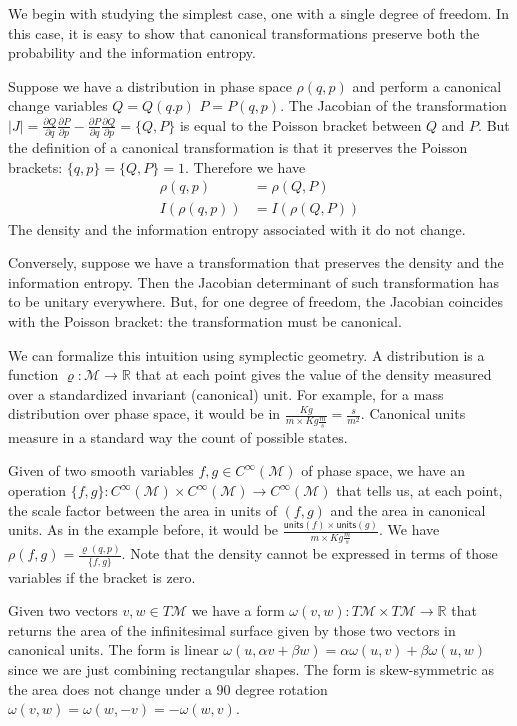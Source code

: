 \documentclass[smallextended]{svjour3}
\numberwithin{equation}{section}
\theoremstyle{definition}
\begin{document}
We begin with studying the simplest case, one with a single degree of freedom. In this case, it is easy to show that canonical transformations preserve both the probability and the information entropy.

Suppose we have a distribution in phase space $\rho(q, p)$ and perform a canonical change variables $Q=Q(q.p)$ $P=P(q,p)$. The Jacobian of the transformation $|J| = \frac{\partial Q}{\partial q}\frac{\partial P}{\partial p} - \frac{\partial P}{\partial q} \frac{\partial Q}{\partial p} = \{Q, P\}$ is equal to the Poisson bracket between $Q$ and $P$. But the definition of a canonical transformation is that it preserves the Poisson brackets: $\{q,p\} = \{Q, P\} = 1$. Therefore we have
\begin{align}
\rho(q, p) &= \rho(Q,P) \\
I(\rho(q,p)) &= I(\rho(Q,P))
\end{align}
The density and the information entropy associated with it do not change.

Conversely, suppose we have a transformation that preserves the density and the information entropy. Then the Jacobian determinant of such transformation has to be unitary everywhere. But, for one degree of freedom, the Jacobian coincides with the Poisson bracket: the transformation must be canonical.

We can formalize this intuition using symplectic geometry. A distribution is a function $\varrho : \mathcal{M} \rightarrow \mathbb{R}$ that at each point gives the value of the density measured over a standardized invariant (canonical) unit. For example, for a mass distribution over phase space, it would be in $\frac{Kg}{m \times Kg \frac{m}{s}} = \frac{s}{m^2}$. Canonical units measure in a standard way the count of possible states.

Given of two smooth variables $f,g \in C^\infty(\mathcal{M})$ of phase space, we have an operation $\{ f , g \} : C^\infty(\mathcal{M}) \times C^\infty(\mathcal{M}) \rightarrow C^\infty(\mathcal{M})$ that tells us, at each point, the scale factor between the area in units of $(f,g)$ and the area in canonical units. As in the example before, it would be $\frac{\textsf{units}(f) \times \textsf{units}(g)}{m \times Kg \frac{m}{s}}$. We have $\rho(f,g) = \frac{\varrho(q,p)}{\{ f , g \}}$. Note that the density cannot be expressed in terms of those variables if the bracket is zero.

Given two vectors $v,w \in T\mathcal{M}$ we have a form $\omega(v,w) : T\mathcal{M} \times T\mathcal{M} \rightarrow \mathbb{R}$ that returns the area of the infinitesimal surface given by those two vectors in canonical units. The form is linear $\omega(u,\alpha v+ \beta w)=\alpha\omega(u, v)+\beta\omega(u,w)$ since we are just combining rectangular shapes. The form is skew-symmetric as the area does not change under a $90$ degree rotation $\omega(v,w) = \omega(w,-v) = -\omega(w,v)$.
\end{document}
